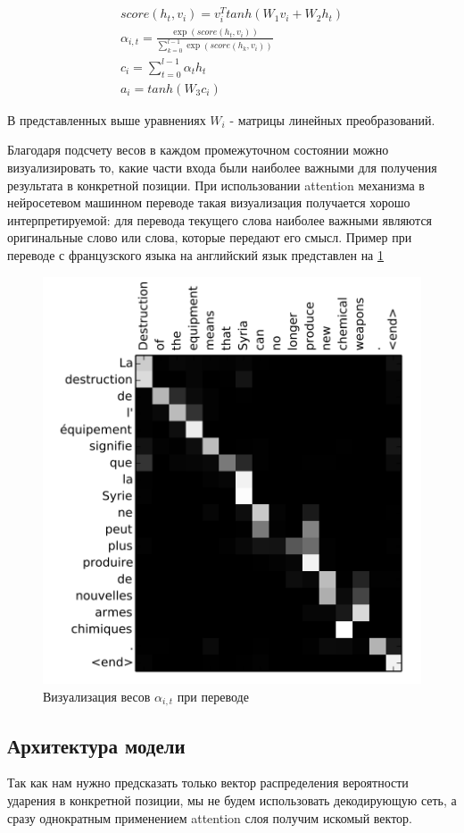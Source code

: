 \documentclass[14pt, a4paper, russian]{extreport}
\begin{document}
\begin{gather}
\label{eq:score} score(h_t, v_i) = v_i^Ttanh\left( W_1 v_i + W_2 h_t\right) \\
\label{eq:prob} \alpha_{i,t}=\frac{\exp\left(score\left(h_t,   v_i\right) \right) }{\sum\limits_{k=0} ^{l-1} \exp\left(score\left(h_k,   v_i\right) \right)}\\
\label{eq:att_vec} c_i = \sum\limits_{t=0}^{l-1} \alpha_t h_t \\
\label{eq:out_vector} a_i = tanh\left(W_3 c_i \right)  
\end{gather}
 
В представленных выше уравнениях $W_i$ - матрицы линейных преобразований.

Благодаря подсчету весов в каждом промежуточном состоянии можно визуализировать то, какие части входа были наиболее важными для получения результата в конкретной позиции. При использовании attention механизма в нейросетевом машинном переводе такая визуализация получается хорошо интерпретируемой: для перевода текущего слова наиболее важными являются оригинальные слово или слова, которые передают его смысл. Пример при переводе с французского языка на английский язык представлен на \cref{fig:att_map}

\begin{figure}[H]
	\begin{center}
		\includegraphics[width=0.5\linewidth]{AttentionMap}
	\end{center}
	\caption{\small{Визуализация весов $\alpha_{i,t}$ при переводе}}
	\label{fig:att_map}
\end{figure}


\subsection{Архитектура модели}
Так как нам нужно предсказать только вектор распределения вероятности ударения в конкретной позиции, мы не будем использовать декодирующую сеть, а сразу однократным применением attention слоя получим искомый вектор.
\end{document}
